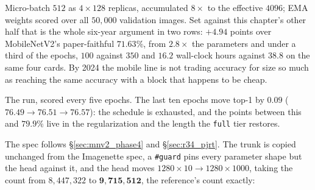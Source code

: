 \noindent Micro-batch $512$ as $4 \times 128$ replicas, accumulated
$8\times$ to the effective $4096$; EMA weights scored over all
$50{,}000$ validation images. Set against this chapter's other half
that is the whole six-year argument in two rows: $\mathbf{+4.94}$
points over MobileNetV2's paper-faithful $71.63\%$, from $2.8\times$
the parameters and under a third of the epochs, $100$ against $350$
and $16.2$ wall-clock hours against $38.8$ on the same four cards.
By 2024 the mobile line is not trading accuracy for size so
much as reaching the same accuracy with a block that happens to be
cheap.

\begin{center}
\end{center}

\noindent The run, scored every five epochs. The last ten epochs move
top-1 by $0.09$ ($76.49 \to 76.51 \to 76.57$): the schedule is
exhausted, and the points between this and $79.9\%$ live in the
regularization and the length the \texttt{full} tier restores.

\label{sec:mnv4_pjrt}

The spec follows \S\ref{sec:mnv2_phase4} and \S\ref{sec:r34_pjrt}. The trunk is
copied unchanged from the Imagenette spec, a \texttt{\#guard} pins every
parameter shape but the head against it, and the head moves
$1280{\times}10 \to 1280{\times}1000$, taking the count from
$8{,}447{,}322$ to $\mathbf{9{,}715{,}512}$, the reference's count
exactly:

